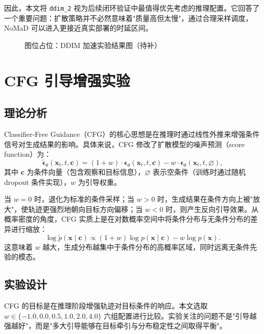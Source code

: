 因此，本文将 \texttt{ddim\_2} 视为后续闭环验证中最值得优先考虑的推理配置。它回答了一个重要问题：扩散策略并不必然意味着"质量高但太慢"，通过合理采样调度，NoMaD 可以进入更接近真实部署的时延区间。

\begin{figure}[htbp]
    \centering
    \fbox{\rule{0pt}{52mm}\rule{0.84\linewidth}{0pt}}
    \caption{图位占位：DDIM 加速实验结果图（待补）}
    \label{fig:algo-ddim-placeholder}
\end{figure}

\section{CFG 引导增强实验}

\subsection{理论分析}

Classifier-Free Guidance（CFG）的核心思想是在推理时通过线性外推来增强条件信号对生成结果的影响\cite{cfg2022}。具体来说，CFG 修改了扩散模型的噪声预测（score function）为：
\begin{equation}
\tilde{\boldsymbol{\epsilon}}_\theta(\mathbf{x}_t, t, \mathbf{c}) = (1+w) \cdot \boldsymbol{\epsilon}_\theta(\mathbf{x}_t, t, \mathbf{c}) - w \cdot \boldsymbol{\epsilon}_\theta(\mathbf{x}_t, t, \varnothing),
\end{equation}
其中 $\mathbf{c}$ 为条件向量（包含观察和目标信息），$\varnothing$ 表示空条件（训练时通过随机 dropout 条件实现），$w$ 为引导权重。

当 $w=0$ 时，退化为标准的条件采样；当 $w>0$ 时，生成结果在条件方向上被"放大"，使轨迹更强烈地朝向目标方向偏移；当 $w<0$ 时，则产生反向引导效果。从概率密度的角度，CFG 实质上是在对数概率空间中将条件分布与无条件分布的差异进行缩放：
\begin{equation}
\log \tilde{p}(\mathbf{x} \mid \mathbf{c}) \propto (1+w) \log p(\mathbf{x} \mid \mathbf{c}) - w \log p(\mathbf{x}).
\end{equation}
这意味着 $w$ 越大，生成分布越集中于条件分布的高概率区域，同时远离无条件先验的模态。

\subsection{实验设计}

CFG 的目标是在推理阶段增强轨迹对目标条件的响应\cite{cfg2022}。本文选取 $w\in\{-1.0,0.0,0.5,1.0,2.0,4.0\}$ 六组配置进行比较。实验关注的问题不是"引导越强越好"，而是"多大引导能够在目标牵引与分布稳定性之间取得平衡"。

